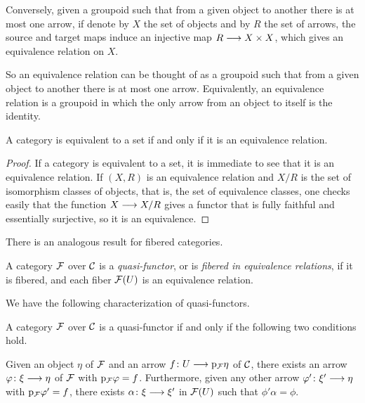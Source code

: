 \begin{3   FIBERED CATEGORIES}
\begin{3.5 Equivalences of fibered categories}
Conversely, given a groupoid such that from a given object to another there is at most one arrow, if denote by $X$ the set of objects and by $R$ the set of arrows, the source and target maps induce an injective map $R \arr X \times X$, which gives an equivalence relation on $X$.

So an equivalence relation can be thought of as a groupoid such that from a given object to another there is at most one arrow. Equivalently, an equivalence relation is a groupoid in which the only arrow from an object to itself is the identity.

\begin{proposition}\label{prop:equivalentset}
A category is equivalent to a set if and only if it is an equivalence relation.
\end{proposition}

\begin{proof}
If a category is equivalent to a set, it is immediate to see that it is an equivalence relation. If $(X, R)$  is an equivalence relation and $X/R$ is the set of isomorphism classes of objects, that is, the set of equivalence classes, one checks easily that the function $X \arr X/R$ gives a functor that is fully faithful and essentially surjective, so it is an equivalence.
\end{proof}


There is an analogous result for fibered categories.

\begin{definition} A category $\mathcal{F}$ over $\mathcal{C}$ is a \emph{quasi-functor}, or is \emph{fibered in equivalence relations}, if it is fibered, and each fiber $\mathcal{F}(U)$ is an equivalence relation.
\end{definition}

We have the following characterization of quasi-functors.

\begin{proposition}\label{prop:characterization-quasifunctors} A category $\mathcal{F}$ over $\mathcal{C}$ is a quasi-functor if and only if the following two conditions hold.

\begin{enumeratei}
\item Given an object $\eta$ of $\mathcal{F}$ and an arrow $f \colon U \arr \p_ \cF \eta$ of $\mathcal{C}$, there exists an arrow $\phi \colon \xi \arr \eta$ of $\mathcal{F}$ with $\mathrm{p}_{\mathcal{F}} \varphi = f$. Furthermore, given any other arrow $\phi'\colon \xi' \arr \eta$ with $\mathrm{p}_{\mathcal{F}}\varphi' = f$, there exists $\alpha\colon \xi \arr \xi'$ in $\mathcal{F}(U)$ such that $\phi'\alpha = \phi$.


\end{enumeratei}
\end{proposition}
\end{3.5 Equivalences of fibered categories}
\end{3   FIBERED CATEGORIES}
